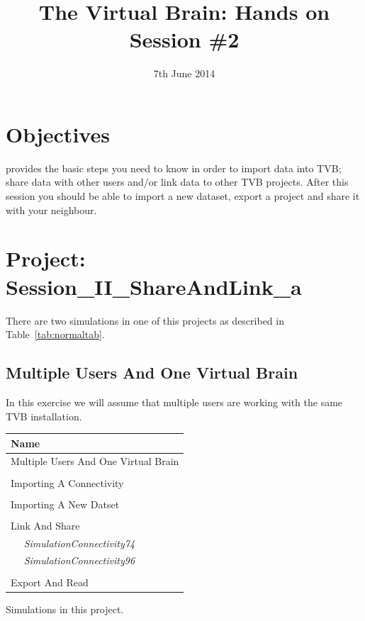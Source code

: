 \documentclass{tufte-handout}
\title{The Virtual Brain: Hands on Session \#2}
\date{7th June 2014}
\begin{document}

\newpage
\ClearWallPaper

\section{Objectives}\label{sec:objectives}

 provides the basic steps you need to know in order to import data into TVB; share data with other users and/or link data to other TVB projects.
After this session you should be able to import a new dataset, export a project and share it with your neighbour. 

\section{Project: Session\_II\_ShareAndLink\_a}\label{sec:project_data}

There are two simulations in one of this projects as described in Table~\ref{tab:normaltab}. 

\subsection{Multiple Users And One Virtual Brain}\label{sec:multiusers}
In this exercise we will assume that multiple users are working with the same TVB installation. 

\begin{margintable}
  \centering
  \selectfont
  \begin{tabular}{l}
    \toprule
    Name \\
    \midrule
    \multicolumn{1}{l}{Multiple Users And One Virtual Brain}\\
    \\
    \multicolumn{1}{l}{Importing A Connectivity}\\
    \\
    \multicolumn{1}{l}{Importing A New Datset}\\
    \\
    \multicolumn{1}{l}{Link And Share}\\
    $\quad$ \textit{SimulationConnectivity74} \\
    $\quad$ \textit{SimulationConnectivity96} \\
    \\
    \multicolumn{1}{l}{Export And Read}\\
    \bottomrule
  \end{tabular}
  \caption{Simulations in this project.}
  \label{tab:normaltab}
\end{margintable}
\end{document}
